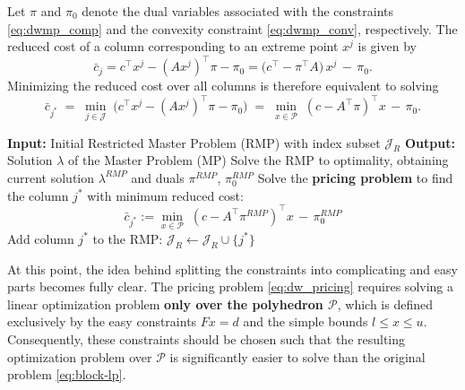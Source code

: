 \documentclass{book}
\theoremstyle{definition}
\newcounter{algorithm_}
\numberwithin{algorithm_}{chapter}
\begin{document}
\bigskip

Let $\pi$ and $\pi_0$ denote the dual variables associated with the constraints \eqref{eq:dwmp_comp} and the convexity constraint \eqref{eq:dwmp_conv}, respectively. The reduced cost of a column corresponding to an extreme point $x^j$ is given by
\[
\bar{c}_j 
= c^\top x^j - (A x^j)^\top \pi - \pi_0
= \big( c^\top - \pi^\top A \big) \, x^j \, - \, \pi_0.
\]
Minimizing the reduced cost over all columns is therefore equivalent to solving
\begin{equation}\label{eq:dw_pricing}
\bar{c}_{j^*} \; = \; \min_{j \in \mathcal{J}} \; \big( c^\top x^j - (A x^j)^\top \pi - \pi_0 \big) \; = \; \min_{x \in \mathcal{P}} \; (c - A^\top \pi)^\top x \, - \, \pi_0.
\end{equation}

\begin{tcolorbox}[colback=gray!10!white, colframe=gray!80!black,
                  title= Algorithm 1.2: Column Generation on the Dantzig--Wolfe Master Problem, sharp corners, boxrule=0.8pt]
{\small
\begin{algorithmic}[1]
\State \textbf{Input:} Initial Restricted Master Problem (RMP) with index subset $\mathcal{J}_R$
\State \textbf{Output:} Solution $\lambda$ of the Master Problem (MP)
\Repeat
    \State Solve the RMP to optimality, obtaining current solution $\lambda^{RMP}$ and duals $\pi^{RMP}$, $\pi^{RMP}_0$
    \State Solve the \textbf{pricing problem} to find the column $j^*$ with minimum reduced cost:
           \[
           \bar{c}_{j^*} := \min_{x \in \mathcal{P}} \; (c - A^\top \pi^{RMP})^\top x \, - \, \pi_0^{RMP}
           \]
        \State Add column $j^*$ to the RMP: $\mathcal{J}_R \gets \mathcal{J}_R \cup \{ j^* \}$
    \EndIf
{}
\end{algorithmic}
} \label{alg:colgen_dw}
\end{tcolorbox} 

\bigskip

At this point, the idea behind splitting the constraints into complicating and easy parts becomes fully clear.  
The pricing problem \eqref{eq:dw_pricing} requires solving a linear optimization problem \textbf{only over the polyhedron $\mathcal{P}$}, which is defined exclusively by the easy constraints $Fx = d$ and the simple bounds $l \le x \le u$. Consequently, these constraints should be chosen such that the resulting optimization problem over $\mathcal{P}$ is significantly easier to solve than the original problem \eqref{eq:block-lp}.
\end{document}
